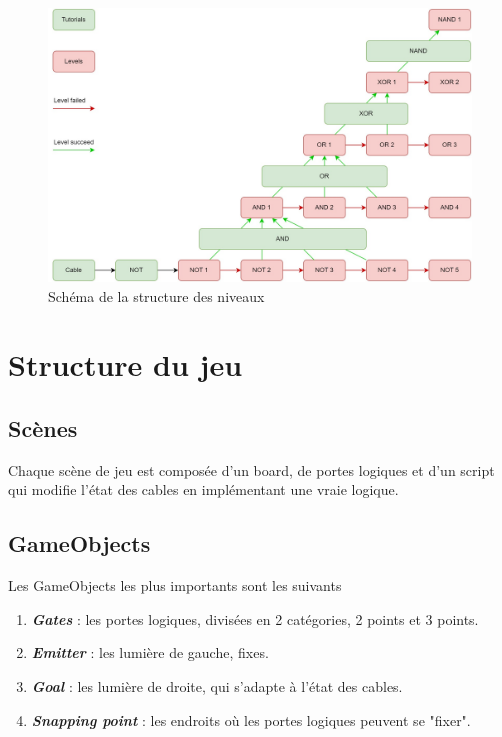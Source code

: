\documentclass{article}
\newcommand{\ib}[1]{\textbf{\textit{#1}}}
\begin{document}
\begin{figure}[h]
    \centering
    \includegraphics[width=\textwidth]{img/Levels Tree.jpg}
    \caption{Schéma de la structure des niveaux}
\end{figure}

\section{Structure du jeu}
    \subsection{Scènes}

    Chaque scène de jeu est composée d'un board, de portes logiques et d'un script qui modifie l'état des cables en implémentant une vraie logique.

    \subsection{GameObjects}
    \noindent
    Les GameObjects les plus importants sont les suivants
    \begin{enumerate}
        \item \ib{Gates} : les portes logiques, divisées en 2 catégories, 2 points et 3 points.
        \item \ib{Emitter} : les lumière de gauche, fixes.
        \item \ib{Goal} : les lumière de droite, qui s'adapte à l'état des cables.
        \item \ib{Snapping point} : les endroits où les portes logiques peuvent se "fixer".
    \end{enumerate}
    
\end{document}
